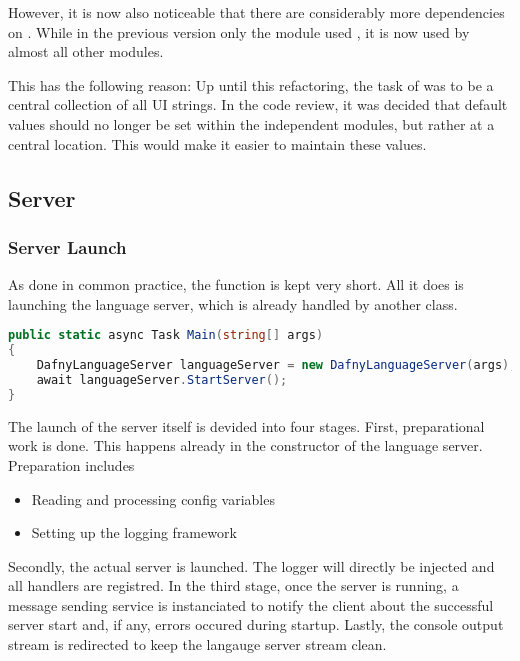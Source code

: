 However, it is now also noticeable that there are considerably more dependencies on .
While in the previous version only the module  used , it is now used by almost all other modules.

This has the following reason: Up until this refactoring, the task of  was to be a central collection of all UI strings. 
In the code review, it was decided that default values should no longer be set within the independent modules,
but rather at a central location.
This would make it easier to maintain these values. \\


\subsection{Server}


\subsubsection{Server Launch}
As done in common practice, the  function is kept very short. All it does is launching the language server, which is already handled by another class.

\begin{lstlisting}[language=csharp, caption={Main Function}, captionpos=b, label={lst:main}]
public static async Task Main(string[] args)
{
    DafnyLanguageServer languageServer = new DafnyLanguageServer(args);
    await languageServer.StartServer();
}
\end{lstlisting}

The launch of the server itself is devided into four stages. First, preparational work is done. This happens already in the constructor of the language server. Preparation includes
\begin{itemize}
    \item Reading and processing config variables
    \item Setting up the logging framework
\end{itemize}
Secondly, the actual server is launched. The logger will directly be injected and all handlers are registred. In the third stage, once the server is running, a message sending service is instanciated to notify the client about the successful server start and, if any, errors occured during startup. Lastly, the console output stream is redirected to keep the langauge server stream clean.

